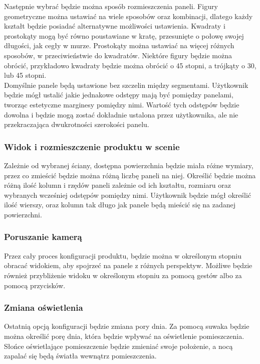 \documentclass{article} %
\begin{document}
        Następnie wybrać będzie można sposób rozmieszczenia paneli. Figury geometryczne można ustawiać na wiele sposobów oraz kombinacji, dlatego każdy kształt będzie posiadać alternatywne możliwości ustawienia. Kwadraty i prostokąty mogą być równo poustawiane w kratę, przesunięte o połowę swojej długości, jak cegły w murze. Prostokąty można ustawiać na więcej różnych sposobów, w przeciwieństwie do kwadratów. Niektóre figury będzie można obrócić, przykładowo kwadraty będzie można obrócić o 45 stopni, a trójkąty o 30, lub 45 stopni.
        \\
        
        Domyślnie panele będą ustawione bez szczelin między segmentami. Użytkownik będzie mógł ustalić jakie jednakowe odstępy mają być pomiędzy panelami, tworząc estetyczne marginesy pomiędzy nimi. Wartość tych odstępów będzie dowolna i będzie mogą zostać dokładnie ustalona przez użytkownika, ale nie przekraczająca dwukrotności szerokości panelu.
        \\
        
        \subsubsection{Widok i rozmieszczenie produktu w scenie}
        Zależnie od wybranej ściany, dostępna powierzchnia będzie miała różne wymiary, przez co zmieścić będzie można różną liczbę paneli na niej. Określić będzie można różną ilość kolumn i rzędów paneli zależnie od ich kształtu, rozmiaru oraz wybranych wcześniej odstępów pomiędzy nimi. Użytkownik będzie mógł określić ilość wierszy, oraz kolumn tak długo jak panele będą mieścić się na zadanej powierzchni.
        \\
        
        \subsubsection{Poruszanie kamerą}
        Przez cały proces konfiguracji produktu, będzie można w określonym stopniu obracać widokiem, aby spojrzeć na panele z różnych perspektyw. Możliwe będzie również przybliżenie widoku w określonym stopniu za pomocą gestów albo za pomocą przycisków. 
        \\
        
        \subsubsection{Zmiana oświetlenia}
        Ostatnią opcją konfiguracji będzie zmiana pory dnia. Za pomocą suwaka będzie można określić porę dnia, która będzie wpływać na oświetlenie pomieszczenia. Słońce oświetlające pomieszczenie będzie zmieniać swoje położenie, a nocą zapalać się będą światła wewnątrz pomieszczenia.
        \\
\end{document}
